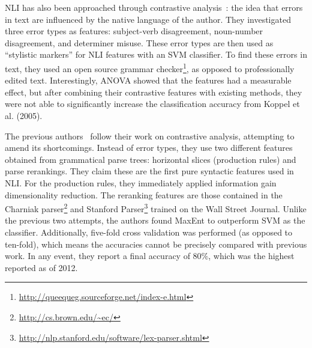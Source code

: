 NLI has also been approached through contrastive
analysis~\cite{wong2009contrastive}: the idea that errors in text are influenced
by the native language of the author. They investigated three error types as
features: subject-verb disagreement, noun-number disagreement, and determiner
misuse. These error types are then used as ``stylistic markers'' for NLI
features with an SVM classifier. To find these errors in text, they used an open
source grammar
checker\footnote{\url{http://queequeg.sourceforge.net/index-e.html}}, as opposed
to professionally edited text. Interestingly, ANOVA showed that the features had
a measurable effect, but after combining their contrastive features with
existing methods, they were not able to significantly increase the
classification accuracy from Koppel et al. (2005).

The previous authors~\cite{wong-rules} follow their work on contrastive
analysis, attempting to amend its shortcomings. Instead of error types, they use
two different features obtained from grammatical parse trees: horizontal slices
(production rules) and parse rerankings. They claim these are the first pure
syntactic features used in NLI\@. For the production rules, they immediately
applied information gain dimensionality reduction. The reranking features are
those contained in the Charniak parser\footnote{\url{http://cs.brown.edu/~ec/}}
and Stanford
Parser\footnote{\url{http://nlp.stanford.edu/software/lex-parser.shtml}} trained
on the Wall Street Journal. Unlike the previous two attempts, the authors found
MaxEnt to outperform SVM as the classifier. Additionally, five-fold cross
validation was performed (as opposed to ten-fold), which means the accuracies
cannot be precisely compared with previous work. In any event, they report a
final accuracy of $80\%$, which was the highest reported as of 2012.

